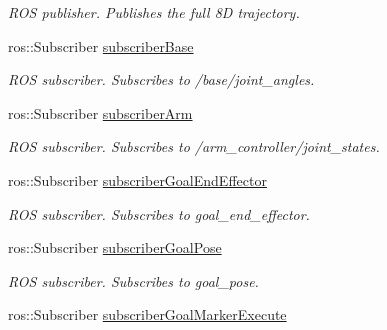 \begin{DoxyCompactItemize}
\begin{DoxyCompactList}\small\item\em R\-O\-S publisher. Publishes the full 8\-D trajectory. \end{DoxyCompactList}\item 
\hypertarget{classSquirrelMotionPlanner_1_1Planner_a29acfed405c437282c2af348fa86bc46}{ros\-::\-Subscriber \hyperlink{classSquirrelMotionPlanner_1_1Planner_a29acfed405c437282c2af348fa86bc46}{subscriber\-Base}}\label{classSquirrelMotionPlanner_1_1Planner_a29acfed405c437282c2af348fa86bc46}

\begin{DoxyCompactList}\small\item\em R\-O\-S subscriber. Subscribes to /base/joint\-\_\-angles. \end{DoxyCompactList}\item 
\hypertarget{classSquirrelMotionPlanner_1_1Planner_a2a0a56a4b25dde9efe31ad6a6f1f9418}{ros\-::\-Subscriber \hyperlink{classSquirrelMotionPlanner_1_1Planner_a2a0a56a4b25dde9efe31ad6a6f1f9418}{subscriber\-Arm}}\label{classSquirrelMotionPlanner_1_1Planner_a2a0a56a4b25dde9efe31ad6a6f1f9418}

\begin{DoxyCompactList}\small\item\em R\-O\-S subscriber. Subscribes to /arm\-\_\-controller/joint\-\_\-states. \end{DoxyCompactList}\item 
\hypertarget{classSquirrelMotionPlanner_1_1Planner_af5f696116c28499c40f5a681782fe108}{ros\-::\-Subscriber \hyperlink{classSquirrelMotionPlanner_1_1Planner_af5f696116c28499c40f5a681782fe108}{subscriber\-Goal\-End\-Effector}}\label{classSquirrelMotionPlanner_1_1Planner_af5f696116c28499c40f5a681782fe108}

\begin{DoxyCompactList}\small\item\em R\-O\-S subscriber. Subscribes to goal\-\_\-end\-\_\-effector. \end{DoxyCompactList}\item 
\hypertarget{classSquirrelMotionPlanner_1_1Planner_aec86250d8a7eddd67f308e7f13912f16}{ros\-::\-Subscriber \hyperlink{classSquirrelMotionPlanner_1_1Planner_aec86250d8a7eddd67f308e7f13912f16}{subscriber\-Goal\-Pose}}\label{classSquirrelMotionPlanner_1_1Planner_aec86250d8a7eddd67f308e7f13912f16}

\begin{DoxyCompactList}\small\item\em R\-O\-S subscriber. Subscribes to goal\-\_\-pose. \end{DoxyCompactList}\item 
\hypertarget{classSquirrelMotionPlanner_1_1Planner_a46d8e61d68603e6151cf93b41f4ed42e}{ros\-::\-Subscriber \hyperlink{classSquirrelMotionPlanner_1_1Planner_a46d8e61d68603e6151cf93b41f4ed42e}{subscriber\-Goal\-Marker\-Execute}}\label{classSquirrelMotionPlanner_1_1Planner_a46d8e61d68603e6151cf93b41f4ed42e}


\end{DoxyCompactItemize}
